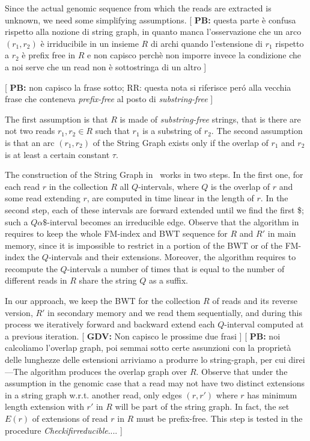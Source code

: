 \documentclass[runningheads,envcountsame,a4paper]{llncs}
\newcommand{\notaestesa}[2]{%
 \marginpar{\color{red!75!black}\textbf{\texttimes}}%
 {\color{red!75!black}%
 [\,\textbullet\,\textsf{\textbf{#1:}} %
 \textsf{\footnotesize#2}\,\textbullet\,]}%
}
\begin{document}
Since the actual genomic sequence from which the reads are extracted is unknown, we need some simplifying assumptions.
\notaestesa{PB}{questa parte è confusa rispetto alla nozione di string graph, in quanto manca l'osservazione che un arco  $(r_1, r_2)$ è irriducibile in un insieme $R$ di archi quando l'estensione di $r_1$ rispetto a $r_2$ è prefix free in $R$ e non capisco perchè non imporre invece la condizione che a noi serve che un read non è sottostringa di un altro}
\notaestesa{PB}{non capisco la frase sotto; RR: questa nota si riferisce per\'o alla vecchia frase che conteneva \emph{prefix-free} al posto di \emph{substring-free}}
The first assumption is that $R$ is made of \emph{substring-free} strings, that is there are not two reads $r_{1}, r_{2}\in R$ such that
$r_{1}$  is a substring of  $r_{2}$.
The second assumption is that an arc $(r_{1}, r_{2})$ of the String Graph exists only if the overlap of $r_{1}$ and $r_{2}$ is at least a certain constant $\tau$.



The construction of the String Graph in~\cite{Simpson2010} works in two
steps.
In the first one, for each read $r$ in the collection $R$ all
$Q$-intervals, where $Q$ is the overlap of $r$ and some read extending $r$,
are computed in time linear in
the  length of $r$.
In the second step, each of these intervals are forward extended until
we find the first \$; such a $Q\alpha\$$-interval becomes an
irreducible edge.
Observe that the algorithm  in~\cite{Simpson2010} requires to keep the whole FM-index
and BWT sequence for $R$ and $R'$ in main memory, since it is impossible to
restrict in a portion of the BWT or of the FM-index the $Q$-intervals
and their extensions.
Moreover, the algorithm requires to recompute the $Q$-intervals a number of
times that is equal to the number of different reads in $R$ share the
string $Q$ as a suffix.


In our approach, we keep the BWT for the collection $R$ of reads and its
reverse version, $R'$ in secondary memory and we read them sequentially,
and during this process we iteratively forward and backward extend each
$Q$-interval computed at a previous iteration.
\notaestesa{GDV}{ Non capisco le prossime due frasi} \notaestesa{PB}{noi calcoliamo l'overlap graph, poi semmai sotto certe assunzioni 
con la proprietà delle lunghezze delle estensioni arriviamo a produrre lo string-graph, per cui direi---The algorithm produces the overlap graph over $R$. Observe that under the assumption in the genomic case that
a read may not have two distinct extensions in a string graph  w.r.t. another  read, only  edges $(r,r')$  where $r$  has  minimum length   extension with 
$r'$  in  $R$    will be part of the string graph.
In fact, the set $E(r)$ of extensions of read $r$ in $R$ must be prefix-free.  
This step  is tested in the procedure
\emph{Checkifirreducible}....}
\end{document}
